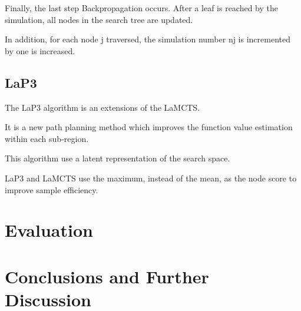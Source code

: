 \documentclass[bibliography=totoc]{scrartcl}
\begin{document}
Finally, the last step Backpropagation occurs. After a leaf is reached by the simulation, all nodes in the search tree are updated.



In addition, for each node j traversed, the simulation number nj is incremented by one is increased.







\subsection{LaP3}







The \ac{LaP3} algorithm is an extensions of the LaMCTS. \cite{NEURIPS2021_03a3655f}



It is a new path planning method which improves the function value estimation within each sub-region.



This algorithm use a latent representation of the search space.



\ac{LaP3} and \ac{LaMCTS} use the maximum, instead of the mean, as the node score to improve sample efficiency.







\section{Evaluation}











\section{Conclusions and Further Discussion}











\clearpage
\end{document}
